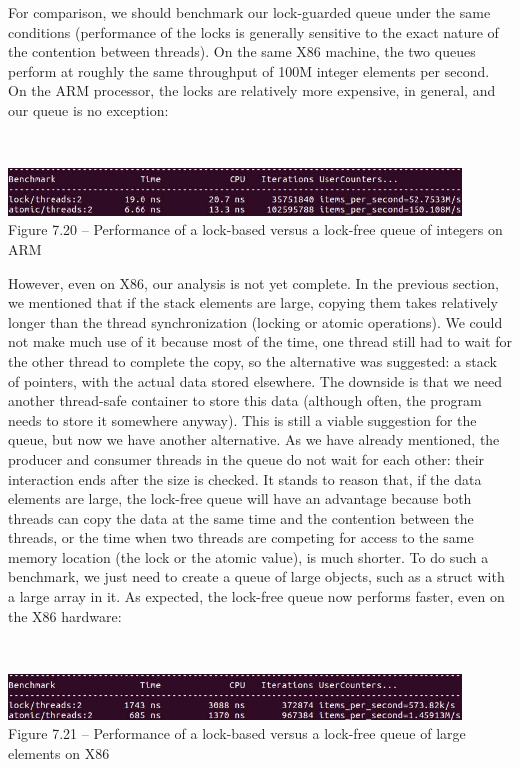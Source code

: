 For comparison, we should benchmark our lock-guarded queue under the same conditions (performance of the locks is generally sensitive to the exact nature of the contention between threads). On the same X86 machine, the two queues perform at roughly the same throughput of 100M integer elements per second. On the ARM processor, the locks are relatively more expensive, in general, and our queue is no exception:

\hspace*{\fill} \\ %
\begin{center}
\includegraphics[width=0.9\textwidth]{content/2/chapter7/images/20.jpg}\\
Figure 7.20 – Performance of a lock-based versus a lock-free queue of integers on ARM
\end{center}

However, even on X86, our analysis is not yet complete. In the previous section, we mentioned that if the stack elements are large, copying them takes relatively longer than the thread synchronization (locking or atomic operations). We could not make much use of it because most of the time, one thread still had to wait for the other thread to complete the copy, so the alternative was suggested: a stack of pointers, with the actual data stored elsewhere. The downside is that we need another thread-safe container to store this data (although often, the program needs to store it somewhere anyway). This is still a viable suggestion for the queue, but now we have another alternative. As we have already mentioned, the producer and consumer threads in the queue do not wait for each other: their interaction ends after the size is checked. It stands to reason that, if the data elements are large, the lock-free queue will have an advantage because both threads can copy the data at the same time and the contention between the threads, or the time when two threads are competing for access to the same memory location (the lock or the atomic value), is much shorter. To do such a benchmark, we just need to create a queue of large objects, such as a struct with a large array in it. As expected, the lock-free queue now performs faster, even on the X86 hardware:

\hspace*{\fill} \\ %
\begin{center}
\includegraphics[width=0.9\textwidth]{content/2/chapter7/images/21.jpg}\\
Figure 7.21 – Performance of a lock-based versus a lock-free queue of large elements on X86
\end{center}

